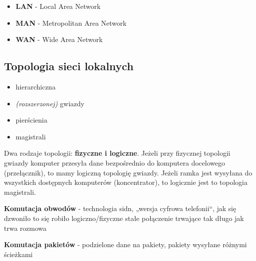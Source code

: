 \documentclass[../main.tex]{subfiles}
\begin{document}
    \begin{itemize}
        \item \textbf{LAN} - Local Area Network
        \item \textbf{MAN} - Metropolitan Area Network
        \item \textbf{WAN} - Wide Area Network
    \end{itemize}


    \subsection{Topologia sieci lokalnych}
    \begin{itemize}
        \item hierarchiczna
        \item \textit{(rozszerzonej)} gwiazdy
        \item pierścienia
        \item magistrali
    \end{itemize}
    Dwa rodzaje topologii: \textbf{fizyczne i logiczne}.
    Jeżeli przy fizycznej topologii gwiazdy komputer przesyła dane bezpośrednio
    do komputera docelowego (przełącznik), to mamy logiczną topologię gwiazdy.
    Jeżeli ramka jest wysyłana do wszystkich dostępnych komputerów
    (koncentrator), to logicznie jest to topologia magistrali.

    \textbf{Komutacja obwodów} - technologia sidn, „wersja cyfrowa telefonii“,
    jak się dzwoniło to się robiło logiczno/fizyczne stałe połączenie trwające
    tak długo jak trwa rozmowa

    \textbf{Komutacja  pakietów} - podzielone dane na pakiety, pakiety wysyłane
    różnymi ścieżkami

\end{document}
